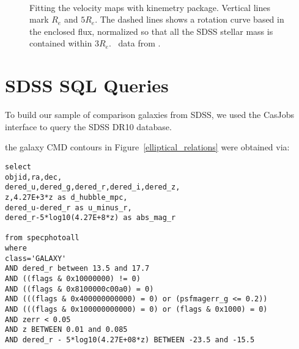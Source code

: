 \documentclass{emulateapj}
\newcommand\HI{\ion{H}{1}}
\begin{document}
\begin{figure*}
 \\
\caption{Fitting the velocity maps with kinemetry package. Vertical lines mark $R_e$ and $5R_e$.  The dashed lines shows a rotation curve based in the enclosed flux, normalized so that all the SDSS stellar mass is contained within $3R_e$.  \HI\ data from \citet{Pickering97}.\label{ugc_kinem}}
\end{figure*}




\clearpage

\appendix
\section{SDSS SQL Queries} \label{SQL}
To build our sample of comparison galaxies from SDSS, we used the CasJobs interface to query the SDSS DR10 database.


the galaxy CMD contours in Figure~\ref{elliptical_relations} were obtained via:
\begin{verbatim}
select 
objid,ra,dec,
dered_u,dered_g,dered_r,dered_i,dered_z,
z,4.27E+3*z as d_hubble_mpc,
dered_u-dered_r as u_minus_r,
dered_r-5*log10(4.27E+8*z) as abs_mag_r 

from specphotoall
where
class='GALAXY'
AND dered_r between 13.5 and 17.7
AND ((flags & 0x10000000) != 0)
AND ((flags & 0x8100000c00a0) = 0)
AND (((flags & 0x400000000000) = 0) or (psfmagerr_g <= 0.2))
AND (((flags & 0x100000000000) = 0) or (flags & 0x1000) = 0)
AND zerr < 0.05
AND z BETWEEN 0.01 and 0.085
AND dered_r - 5*log10(4.27E+08*z) BETWEEN -23.5 and -15.5
\end{verbatim}
\end{document}
